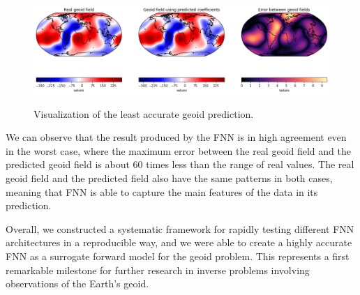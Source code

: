 \begin{figure}[H]
    \caption{Visualization of the least accurate geoid prediction.}
    \includegraphics[scale=0.4]{figures/geoid_images/Geoid_Worst_visualization.png}
    \label{figure:geoid_worst_visual}
\end{figure}

We can observe that the result produced by the FNN is in high agreement even in the worst case, where the maximum error between the real geoid field and the predicted geoid field is about 60 times less than the range of real values. The real geoid field and the predicted field also have the same patterns in both cases, meaning that FNN is able to capture the main features of the data in its prediction.

Overall, we constructed a systematic framework for rapidly testing different FNN architectures in a reproducible way, and we were able to create a highly accurate FNN as a surrogate forward model for the geoid problem. This represents a first remarkable milestone for further research in inverse problems involving observations of the Earth's geoid.